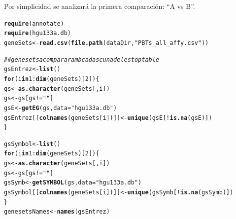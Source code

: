 \documentclass[a4paper]{article}\usepackage[]{graphicx}\usepackage[]{color}
\makeatletter
\newcommand{\hlnum}[1]{\textcolor[rgb]{0.686,0.059,0.569}{#1}}%
\newcommand{\hlstr}[1]{\textcolor[rgb]{0.192,0.494,0.8}{#1}}%
\newcommand{\hlcom}[1]{\textcolor[rgb]{0.678,0.584,0.686}{\textit{#1}}}%
\newcommand{\hlopt}[1]{\textcolor[rgb]{0,0,0}{#1}}%
\newcommand{\hlstd}[1]{\textcolor[rgb]{0.345,0.345,0.345}{#1}}%
\newcommand{\hlkwa}[1]{\textcolor[rgb]{0.161,0.373,0.58}{\textbf{#1}}}%
\newcommand{\hlkwb}[1]{\textcolor[rgb]{0.69,0.353,0.396}{#1}}%
\newcommand{\hlkwc}[1]{\textcolor[rgb]{0.333,0.667,0.333}{#1}}%
\newcommand{\hlkwd}[1]{\textcolor[rgb]{0.737,0.353,0.396}{\textbf{#1}}}%
\newenvironment{kframe}{%
 \def\at@end@of@kframe{}%
 \ifinner\ifhmode%
  \def\at@end@of@kframe{\end{minipage}}%
  \begin{minipage}{\columnwidth}%
 \fi\fi%
 \def\FrameCommand##1{\hskip\@totalleftmargin \hskip-\fboxsep
 \colorbox{shadecolor}{##1}\hskip-\fboxsep
     \hskip-\linewidth \hskip-\@totalleftmargin \hskip\columnwidth}%
 \MakeFramed {\advance\hsize-\width
   \@totalleftmargin\z@ \linewidth\hsize
   \@setminipage}}%
 {\par\unskip\endMakeFramed%
 \at@end@of@kframe}
\newenvironment{knitrout}{}{} %
\makeatother
\begin{document}
Por simplicidad se analizará la primera comparaci\'on: ``A vs B''.

\begin{knitrout}
\color{fgcolor}\begin{kframe}
\begin{alltt}
\hlkwd{require}\hlstd{(annotate)}
\hlkwd{require}\hlstd{(hgu133a.db)}
\hlstd{geneSets} \hlkwb{<-} \hlkwd{read.csv}\hlstd{(}\hlkwd{file.path}\hlstd{(dataDir,} \hlstr{"PBTs_all_affy.csv"}\hlstd{))}

\hlcom{## gene sets a comparar amb cadascuna de les toptable}
\hlstd{gsEntrez} \hlkwb{<-} \hlkwd{list}\hlstd{()}
\hlkwa{for} \hlstd{(i} \hlkwa{in} \hlnum{1}\hlopt{:}\hlkwd{dim}\hlstd{(geneSets)[}\hlnum{2}\hlstd{]) \{}
  \hlstd{gs} \hlkwb{<-} \hlkwd{as.character}\hlstd{(geneSets[,i])}
  \hlstd{gs} \hlkwb{<-} \hlstd{gs[gs} \hlopt{!=} \hlstr{""}\hlstd{]}
  \hlstd{gsE} \hlkwb{<-} \hlkwd{getEG}\hlstd{(gs,} \hlkwc{data} \hlstd{=} \hlstr{"hgu133a.db"}\hlstd{)}
  \hlstd{gsEntrez[[}\hlkwd{colnames}\hlstd{(geneSets[i])]]} \hlkwb{<-} \hlkwd{unique}\hlstd{(gsE[}\hlopt{!}\hlkwd{is.na}\hlstd{(gsE)])}
\hlstd{\}}

\hlstd{gsSymbol} \hlkwb{<-} \hlkwd{list}\hlstd{()}
\hlkwa{for} \hlstd{(i} \hlkwa{in} \hlnum{1}\hlopt{:}\hlkwd{dim}\hlstd{(geneSets)[}\hlnum{2}\hlstd{]) \{}
  \hlstd{gs} \hlkwb{<-} \hlkwd{as.character}\hlstd{(geneSets[,i])}
  \hlstd{gs} \hlkwb{<-} \hlstd{gs[gs} \hlopt{!=} \hlstr{""}\hlstd{]}
  \hlstd{gsSymb} \hlkwb{<-} \hlkwd{getSYMBOL}\hlstd{(gs,}\hlkwc{data} \hlstd{=} \hlstr{"hgu133a.db"}\hlstd{)}
  \hlstd{gsSymbol[[}\hlkwd{colnames}\hlstd{(geneSets[i])]]} \hlkwb{<-} \hlkwd{unique}\hlstd{(gsSymb[}\hlopt{!}\hlkwd{is.na}\hlstd{(gsSymb)])}
\hlstd{\}}
\hlstd{genesetsNames} \hlkwb{<-} \hlkwd{names}\hlstd{(gsEntrez)}
\end{alltt}
\end{kframe}
\end{knitrout}
\end{document}
